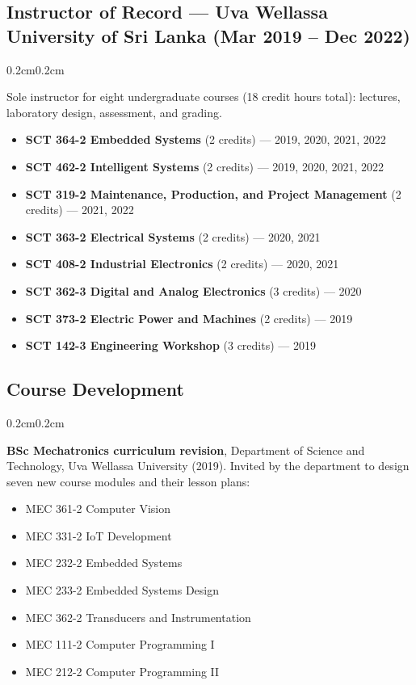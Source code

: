 \documentclass[10pt, letterpaper]{article}
\newenvironment{highlights}{%
    \begin{itemize}[topsep=0.08cm, parsep=0.08cm, partopsep=0pt,
                    itemsep=0pt, leftmargin=0.4cm + 10pt]
}{\end{itemize}}
\newenvironment{onecolentry}{%
    \begin{adjustwidth}{0.2cm}{0.2cm}
}{\end{adjustwidth}}
\begin{document}
\subsection{Instructor of Record --- Uva Wellassa University of Sri Lanka (Mar 2019 -- Dec 2022)}
\begin{onecolentry}
Sole instructor for eight undergraduate courses (18 credit hours total): lectures,
laboratory design, assessment, and grading.
\begin{highlights}
    \item \textbf{SCT 364-2 Embedded Systems} (2 credits) --- 2019, 2020, 2021, 2022
    \item \textbf{SCT 462-2 Intelligent Systems} (2 credits) --- 2019, 2020, 2021, 2022
    \item \textbf{SCT 319-2 Maintenance, Production, and Project Management}
          (2 credits) --- 2021, 2022
    \item \textbf{SCT 363-2 Electrical Systems} (2 credits) --- 2020, 2021
    \item \textbf{SCT 408-2 Industrial Electronics} (2 credits) --- 2020, 2021
    \item \textbf{SCT 362-3 Digital and Analog Electronics} (3 credits) --- 2020
    \item \textbf{SCT 373-2 Electric Power and Machines} (2 credits) --- 2019
    \item \textbf{SCT 142-3 Engineering Workshop} (3 credits) --- 2019
\end{highlights}
\end{onecolentry}
\vspace{0.14cm}

\subsection{Course Development}
\begin{onecolentry}
    \textbf{BSc Mechatronics curriculum revision}, Department of Science and
    Technology, Uva Wellassa University (2019). Invited by the department to design
    seven new course modules and their lesson plans:
    \begin{highlights}
        \item MEC 361-2 Computer Vision
        \item MEC 331-2 IoT Development
        \item MEC 232-2 Embedded Systems
        \item MEC 233-2 Embedded Systems Design
        \item MEC 362-2 Transducers and Instrumentation
        \item MEC 111-2 Computer Programming I
        \item MEC 212-2 Computer Programming II
    \end{highlights}
\end{onecolentry}
\vspace{0.14cm}
\end{document}
